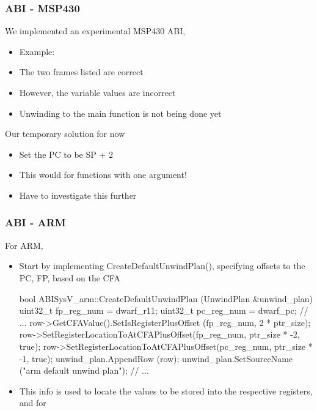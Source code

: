 \begin{frame}[fragile]
\frametitle{ABI - MSP430}
We implemented an experimental MSP430 ABI, 
\begin{itemize}   
\item Example:
    \item The two frames listed are correct
    \item However, the variable values are incorrect
    \item Unwinding to the main function is not being done yet    
\end{itemize}
Our temporary solution for now
\begin{itemize}
    \item Set the PC to be SP + 2
    \item This would  for functions with one argument!
    \item Have to investigate this further
\end{itemize}
\end{frame}

\begin{frame}[fragile]
\frametitle{ABI - ARM}
For ARM,
\begin{itemize}
    \item Start by implementing CreateDefaultUnwindPlan(), specifying offsets to the PC, FP, based on the CFA
    \begin{codebox}
bool
ABISysV_arm::CreateDefaultUnwindPlan (UnwindPlan &unwind_plan)
{
    uint32_t fp_reg_num = dwarf_r11;
    uint32_t pc_reg_num = dwarf_pc;
    // ...
    row->GetCFAValue().SetIsRegisterPlusOffset (fp_reg_num, 2 * ptr_size);
    row->SetRegisterLocationToAtCFAPlusOffset(fp_reg_num, ptr_size * -2, true);
    row->SetRegisterLocationToAtCFAPlusOffset(pc_reg_num, ptr_size * -1, true);
    unwind_plan.AppendRow (row);
    unwind_plan.SetSourceName ("arm default unwind plan");
    // ...
}
    \end{codebox}
    \item This info is used to locate the values to be stored into the respective registers, and for 
\end{itemize}
\end{frame}

